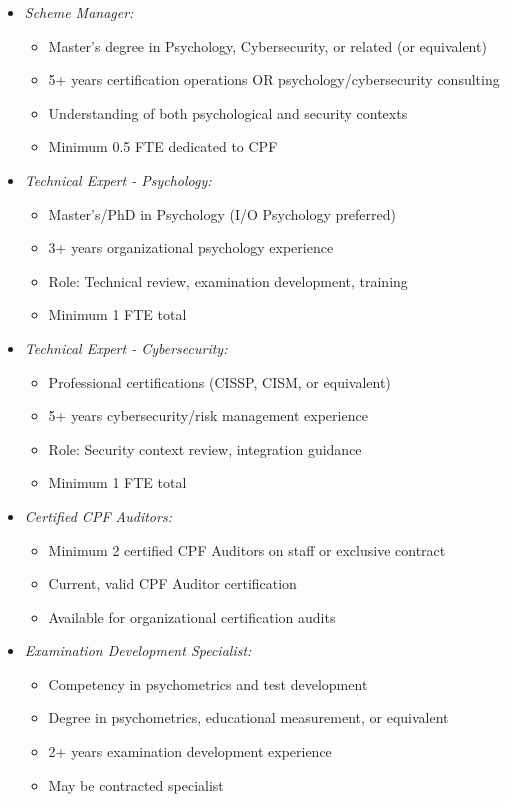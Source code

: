 \documentclass[11pt,a4paper]{article}
\begin{document}
\begin{itemize}
\item \textit{Scheme Manager:}
\begin{itemize}
\item Master's degree in Psychology, Cybersecurity, or related (or equivalent)
\item 5+ years certification operations OR psychology/cybersecurity consulting
\item Understanding of both psychological and security contexts
\item Minimum 0.5 FTE dedicated to CPF
\end{itemize}

\item \textit{Technical Expert - Psychology:}
\begin{itemize}
\item Master's/PhD in Psychology (I/O Psychology preferred)
\item 3+ years organizational psychology experience
\item Role: Technical review, examination development, training
\item Minimum 1 FTE total
\end{itemize}

\item \textit{Technical Expert - Cybersecurity:}
\begin{itemize}
\item Professional certifications (CISSP, CISM, or equivalent)
\item 5+ years cybersecurity/risk management experience
\item Role: Security context review, integration guidance
\item Minimum 1 FTE total
\end{itemize}

\item \textit{Certified CPF Auditors:}
\begin{itemize}
\item Minimum 2 certified CPF Auditors on staff or exclusive contract
\item Current, valid CPF Auditor certification
\item Available for organizational certification audits
\end{itemize}

\item \textit{Examination Development Specialist:}
\begin{itemize}
\item Competency in psychometrics and test development
\item Degree in psychometrics, educational measurement, or equivalent
\item 2+ years examination development experience
\item May be contracted specialist
\end{itemize}


\end{itemize}
\end{document}
